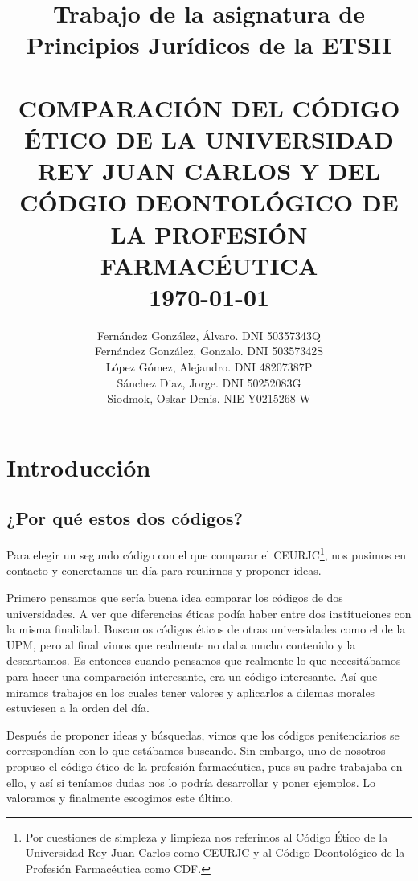 \documentclass[11pt,a4paper]{article}
\title{	\normalsize {Trabajo de la asignatura de Principios Jurídicos de la ETSII} 	%
		 	\\[.5cm]								%
			\HRule{0.5pt} \\						%
			\LARGE \textbf{\uppercase{Comparación del Código Ético de la Universidad Rey Juan Carlos y del Códgio Deontológico de la Profesión Farmacéutica}}	%
			\HRule{2pt} \\ [0.5cm]		%
			\normalsize \today			%
		}
\author{
		Fernández González, Álvaro.  DNI 50357343Q\\
		Fernández González, Gonzalo.  DNI 50357342S\\
		López Gómez, Alejandro.  DNI 48207387P\\
		Sánchez Diaz, Jorge.  DNI 50252083G \\
		Siodmok, Oskar Denis.  NIE Y0215268-W \\
}
\makeatletter
\def\printtitle{%
    {\centering \@title\par}}
\def\printauthor{%
    {\centering \large \@author}}
\makeatother
\begin{document}

\thispagestyle{empty}		%

\printtitle					%
\vfill
\printauthor				%
\newpage
\pagestyle{plain}
\tableofcontents
\pagebreak




\setlength\parindent{.5in}

\section{Introducción}
\subsection{¿Por qué estos dos códigos?}
Para elegir un segundo código con el que comparar el CEURJC\footnote{Por cuestiones de simpleza y limpieza nos referimos al Código Ético de la Universidad Rey Juan Carlos como CEURJC y al Código Deontológico de la Profesión Farmacéutica como CDF.}, nos pusimos en contacto y concretamos un día para reunirnos y proponer ideas.

Primero pensamos que sería buena idea comparar los códigos de dos universidades. A ver que diferencias éticas podía haber entre dos instituciones con la misma finalidad. Buscamos códigos éticos de otras universidades como el de la UPM, pero al final vimos que realmente no daba mucho contenido y la descartamos. Es entonces cuando pensamos que realmente lo que necesitábamos para hacer una comparación interesante, era un código interesante. Así que miramos trabajos en los cuales tener valores y aplicarlos a dilemas morales estuviesen a la orden del día.

Después de proponer ideas y búsquedas, vimos que los códigos penitenciarios se correspondían con lo que estábamos buscando. Sin embargo, uno de nosotros propuso el código ético de la profesión farmacéutica, pues su padre trabajaba en ello, y así si teníamos dudas nos lo podría desarrollar y poner ejemplos. Lo valoramos y finalmente escogimos este último.
\end{document}
